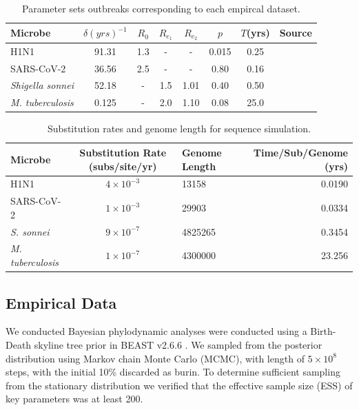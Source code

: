 \documentclass{article}
\begin{document}
\begin{spacing}{1.5}
\begin{table}[ht]
    \centering
    \caption{Parameter sets outbreaks corresponding to each empircal dataset.}
    \begin{tabular}{l|c|c|c|c|c|c|l|}
    \hline
    Microbe                     &   $\delta (yrs)^{-1}$    & $R_0$ &   $R_{e_1}$   &  $R_{e_2}$    &   $p$   &   $T$(yrs)   & Source \\
    \hline
    H1N1                        &   91.31    & 1.3 &   -   &  -    &   0.015   &   0.25 & \citet{hedge_2013_real-time} \\
    SARS-CoV-2                  &   36.56    & 2.5 &   -   &  -   &   0.80   &  0.16 & \citet{lane2021genomics} \\
    \textit{Shigella sonnei}    &   52.18    &  - &   1.5   &  1.01   &   0.40   &   0.50 & \citet{ingle_co-circulation_2019} \\
    \textit{M. tuberculosis}    &   0.125    &  - &   2.0   &  1.10    &   0.08   &   25.0 & \citet{kuhnert_tuberculosis_2018} \\
    \hline
    \end{tabular}
    \label{tab:sim_parms}
\end{table}

\begin{table}[h!]
    \centering
    \caption{Substitution rates and genome length for sequence simulation.}
    \begin{tabular}{l|c|l|r}
    \hline
    Microbe                     &   Substitution Rate (subs/site/yr) & Genome Length & Time/Sub/Genome (yrs)  \\
    \hline
    H1N1                        & $4\times10^{-3}$ & 13158 & 0.0190\\
    SARS-CoV-2                  & $1\times10^{-3}$ & 29903 & 0.0334\\
    \textit{S. sonnei}    & $9\times10^{-7}$ & 4825265  & 0.3454\\
    \textit{M. tuberculosis}    &   $1\times10^{-7}$ & 4300000 & 23.256\\
    \hline
    \end{tabular}
    \label{tab:seq_parms}
\end{table}

\subsection*{Empirical Data}
We conducted Bayesian phylodynamic analyses were conducted using a Birth-Death skyline tree prior in BEAST v2.6.6 \citep{bouckaert_beast_2019}. We sampled from the posterior distribution using Markov chain Monte Carlo (MCMC), with length of $5\times10^{8}$ steps, with the initial 10\% discarded as burin. To determine sufficient sampling from the stationary distribution we verified that the effective sample size (ESS) of key parameters was at least 200.


\end{spacing}
\end{document}
